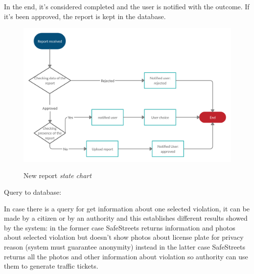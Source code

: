 \documentclass[../RASD.tex]{subfiles}
\begin{document}
    In the end, it’s considered completed and the user is notified with the outcome. If it’s been approved, the report is kept in the database.
    \begin{figure}[H]
        \centering
        \includegraphics[scale = 0.3]{assets/newReportV2.png}\\[1.6 cm]
        \caption[ New report \textit{state diagram}]{ New report \textit{state chart}}
    \end{figure}

    Query to database:

    In case there is a query for get information about one selected violation, it can be made by a citizen or by an authority and this establishes different results showed by the system: in the former case SafeStreets returns information and photos about selected violation but doesn’t show photos about license plate for privacy reason (system must guarantee anonymity) instead in the latter case SafeStreets returns all the photos and other information about violation so authority can use them to generate traffic tickets.
\end{document}
